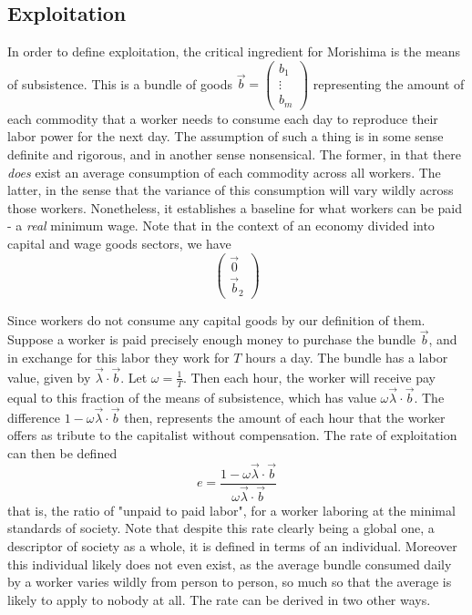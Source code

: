 \subsection{Exploitation}
In order to define exploitation, the critical ingredient for Morishima is the means of subsistence. This is a bundle of goods $\vec{b} = \begin{pmatrix} b_1 \\ \vdots \\ b_m \end{pmatrix}$ representing the amount of each commodity that a worker needs to consume each day to reproduce their labor power for the next day. The assumption of such a thing is in some sense definite and rigorous, and in another sense nonsensical. The former, in that there \textit{does} exist an average consumption of each commodity across all workers. The latter, in the sense that the variance of this consumption will vary wildly across those workers. Nonetheless, it establishes a baseline for what workers can be paid - a \textit{real} minimum wage. Note that in the context of an economy divided into capital and wage goods sectors, we have 
\[ \begin{pmatrix} \vec{0} \\ \vec{b}_2 \end{pmatrix} \] \par
Since workers do not consume any capital goods by our definition of them. Suppose a worker is paid precisely enough money to purchase the bundle $\vec{b}$, and in exchange for this labor they work for $T$ hours a day. The bundle has a labor value, given by $\vec{\lambda} \cdot \vec{b}$. Let $\omega = \frac{1}{T}$. Then each hour, the worker will receive pay equal to this fraction of the means of subsistence, which has value $\omega \vec{\lambda}\cdot \vec{b}$. The difference $1-\omega\vec{\lambda}\cdot \vec{b}$ then, represents the amount of each hour that the worker offers as tribute to the capitalist without compensation. The rate of exploitation can then be defined
\[ e = \frac{1-\omega\vec{\lambda}\cdot \vec{b}}{\omega\vec{\lambda}\cdot \vec{b}} \]   
that is, the ratio of "unpaid to paid labor", for a worker laboring at the minimal standards of society. Note that despite this rate clearly being a global one, a descriptor of society as a whole, it is defined in terms of an individual. Moreover this individual likely does not even exist, as the average bundle consumed daily by a worker varies wildly from person to person, so much so that the average is likely to apply to nobody at all. The rate can be derived in two other ways. \par 
